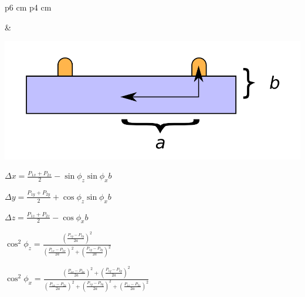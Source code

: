 \documentclass[compress]{beamer}
\begin{document}
\begin{frame}
\begin{tabular}{p{6 cm} p{4 cm}}
\begin{minipage}{\linewidth}
\end{minipage} &
\begin{minipage}{\linewidth}
\includegraphics[width=4 cm]{annotate.png}
\end{minipage}
\end{tabular}

$\displaystyle \Delta x = \frac{P_{1x} + P_{2x}}{2} - \sin\phi_z \sin\phi_x b$

\hfill $\displaystyle \Delta y = \frac{P_{1y} + P_{2y}}{2} + \cos\phi_z \sin\phi_x b$

$\displaystyle \Delta z = \frac{P_{1z} + P_{2z}}{2} - \cos\phi_x b$

\hfill $\displaystyle \cos^2\phi_z = \frac{\left(\frac{P_{1y} - P_{2y}}{2a}\right)^2}{\left(\frac{P_{1x} - P_{2x}}{2a}\right)^2 + \left(\frac{P_{1y} - P_{2y}}{2a}\right)^2}$

\vfill
$\displaystyle \cos^2\phi_x = \frac{\left(\frac{P_{1x} - P_{2x}}{2a}\right)^2 + \left(\frac{P_{1y} - P_{2y}}{2a}\right)^2}{\left(\frac{P_{1x} - P_{2x}}{2a}\right)^2 + \left(\frac{P_{1y} - P_{2y}}{2a}\right)^2 + \left(\frac{P_{1z} - P_{2z}}{2a}\right)^2}$
\end{frame}
\end{document}
